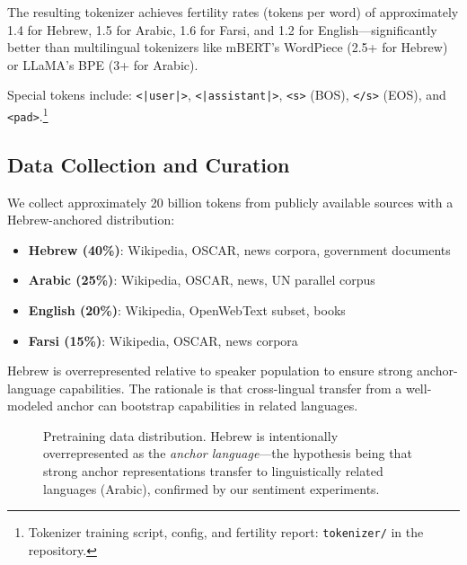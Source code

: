 \documentclass[10pt,twocolumn]{article}
\begin{document}
The resulting tokenizer achieves fertility rates (tokens per word) of approximately 1.4 for Hebrew, 1.5 for Arabic, 1.6 for Farsi, and 1.2 for English---significantly better than multilingual tokenizers like mBERT's WordPiece (2.5+ for Hebrew) or LLaMA's BPE (3+ for Arabic).

Special tokens include: \texttt{<|user|>}, \texttt{<|assistant|>}, \texttt{<s>} (BOS), \texttt{</s>} (EOS), and \texttt{<pad>}.\footnote{Tokenizer training script, config, and fertility report: \texttt{tokenizer/} in the repository.}

\subsection{Data Collection and Curation}

We collect approximately 20 billion tokens from publicly available sources with a Hebrew-anchored distribution:

\begin{itemize}
    \item \textbf{Hebrew (40\%)}: Wikipedia, OSCAR, news corpora, government documents
    \item \textbf{Arabic (25\%)}: Wikipedia, OSCAR, news, UN parallel corpus
    \item \textbf{English (20\%)}: Wikipedia, OpenWebText subset, books
    \item \textbf{Farsi (15\%)}: Wikipedia, OSCAR, news corpora
\end{itemize}

Hebrew is overrepresented relative to speaker population to ensure strong anchor-language capabilities. The rationale is that cross-lingual transfer from a well-modeled anchor can bootstrap capabilities in related languages.

\begin{figure}[H]
\centering
{}
\caption{Pretraining data distribution. Hebrew is intentionally overrepresented as the \emph{anchor language}---the hypothesis being that strong anchor representations transfer to linguistically related languages (Arabic), confirmed by our sentiment experiments.}
\label{fig:data_dist}
\end{figure}
\end{document}
